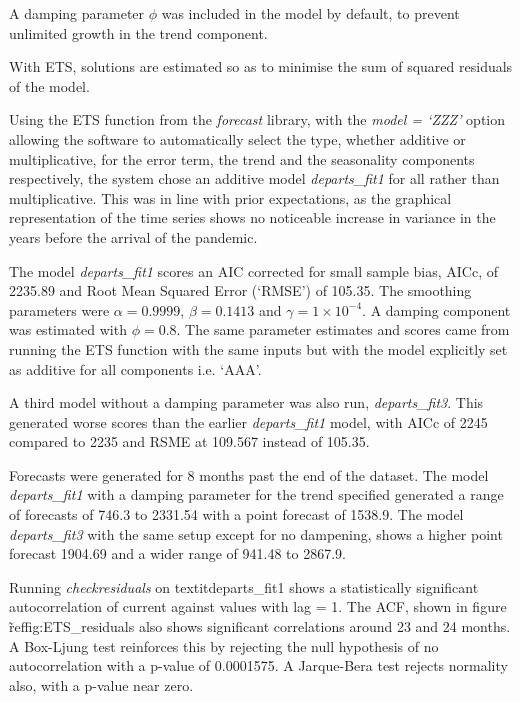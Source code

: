 \documentclass[conference]{IEEEtran}
\begin{document}
A damping parameter $\phi$ was included in the model by default, to prevent unlimited growth in the trend component. 

With ETS, solutions are estimated so as to minimise the sum of squared residuals of the model.  

Using the ETS function from the \textit{forecast} library, with the \textit{model = `ZZZ'} option allowing the software to automatically select the type, whether additive or multiplicative, for the error term, the trend and the seasonality components respectively, the system chose an additive model \textit{departs\_fit1} for all rather than multiplicative.  This was in line with prior expectations, as the graphical representation of the time series shows no noticeable increase in variance in the years before the arrival of the pandemic.  

The model \textit{departs\_fit1} scores an AIC corrected for small sample bias, AICc, of 2235.89 and Root Mean Squared Error (`RMSE') of 105.35.  The smoothing parameters were $\alpha = 0.9999$, $\beta = 0.1413$ and $\gamma = 1 \times 10^{-4}$.  A damping component was estimated with $\phi = 0.8$.  The same parameter estimates and scores came from running the ETS function with the same inputs but with the model explicitly set as additive for all components i.e. `AAA'.  

A third model without a damping parameter was also run, \textit{departs\_fit3}.  This generated worse scores than the earlier \textit{departs\_fit1} model, with AICc of 2245 compared to 2235 and RSME at 109.567 instead of 105.35.  

Forecasts were generated for 8 months past the end of the dataset.  The model \textit{departs\_fit1} with a damping parameter for the trend specified generated a range of forecasts of 746.3 to 2331.54 with a point forecast of 1538.9.  The model \textit{departs\_fit3} with the same setup except for no dampening, shows a higher point forecast 1904.69 and a wider range of 941.48 to 2867.9.  

Running \textit{checkresiduals} on textit{departs\_fit1} shows a statistically significant autocorrelation of current against values with lag = 1.  The ACF, shown in figure \~ref{fig:ETS_residuals} also shows significant correlations around 23 and 24 months. A Box-Ljung test reinforces this by rejecting the null hypothesis of no autocorrelation with a p-value of 0.0001575.  A Jarque-Bera test rejects normality also, with a p-value near zero. 
\end{document}
